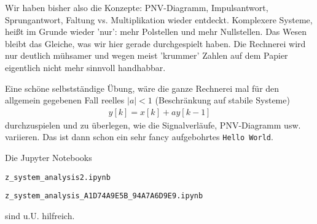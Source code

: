 \begin{Loesung}
%
Wir haben bisher also die Konzepte: PNV-Diagramm, Impulsantwort, Sprungantwort,
Faltung vs. Multiplikation wieder entdeckt.
%
Komplexere Systeme, heißt im Grunde wieder 'nur': mehr Polstellen und mehr
Nullstellen. Das Wesen bleibt das Gleiche, was wir hier gerade durchgespielt
haben. Die Rechnerei wird nur deutlich mühsamer und wegen meist 'krummer' Zahlen
auf dem Papier eigentlich nicht mehr sinnvoll handhabbar.

Eine schöne selbstständige Übung, wäre die ganze Rechnerei mal für den allgemein
gegebenen Fall reelles $|a|<1$ (Beschränkung auf stabile Systeme)
\begin{align}
y[k] = x[k] + a y[k-1]
\end{align}
durchzuspielen und zu überlegen, wie die Signalverläufe, PNV-Diagramm usw.
variieren. Das ist dann schon ein sehr fancy aufgebohrtes \texttt{Hello World}.

Die Jupyter Notebooks

\texttt{z\_system\_analysis2.ipynb}

\texttt{z\_system\_analysis\_A1D74A9E5B\_94A7A6D9E9.ipynb}

sind u.U. hilfreich.
\end{Loesung}






